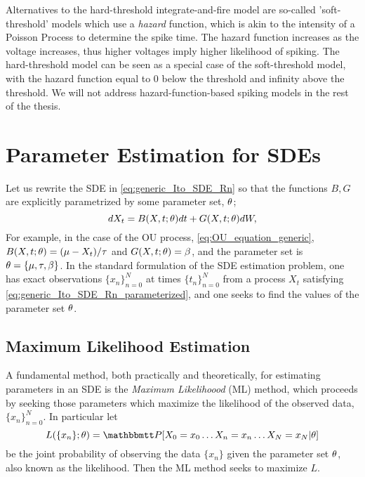 Alternatives to the hard-threshold integrate-and-fire model are so-called
'soft-threshold' models which use a {\sl hazard} function, which is akin to the
intensity of a Poisson Process to determine the spike time. The hazard function
increases as the voltage increases, thus higher voltages imply higher likelihood of
spiking. The hard-threshold model can be seen as a special case of the
soft-threshold model, with the hazard function equal to 0 below the threshold
and infinity above the threshold. We will not address hazard-function-based
spiking models in the rest of the thesis. 

\section{Parameter Estimation for SDEs}
\label{sec:estimation}
Let us rewrite the SDE in \cref{eq:generic_Ito_SDE_Rn} so that the 
functions $B, G$ are explicitly parametrized by some parameter set, ${ \theta}$;
\begin{equation}
dX_t = B(X,t;{ \theta}) dt + G(X,t;{ \theta}) dW,
\label{eq:generic_Ito_SDE_Rn_parameterized}
\end{equation}
For example, in the case of the OU process, \cref{eq:OU_equation_generic},
$B(X,t;{ \theta}) = ({\mu } - {X_t})/{{ \tau }}$ and $G(X,t;{ \theta}) = \beta$, and the
parameter set is ${ \theta} = \{{\mu }, { \tau }, \beta\}$. In the standard formulation of the SDE estimation problem,  
one has exact observations $\{x_n\}_{n=0}^N$ at times $\{t_n\}_{n=0}^N$ from a process $X_t$
satisfying \cref{eq:generic_Ito_SDE_Rn_parameterized}, and one seeks to find the
values of the parameter set ${ \theta}$.

\subsection{Maximum Likelihood Estimation}
A fundamental method, both
practically and theoretically, for estimating parameters in an SDE is the {\sl Maximum
Likelihoood} (ML) method, which proceeds by seeking those parameters which
maximize the likelihood of the observed data, $\{x_n\}_{n=0}^N$. In particular
let $$L(\{x_n\}; \th) = \Prob[ X_0 = x_0\ldots X_n = x_n\ldots X_N = x_N |
\th]$$ be the joint probability of observing the data $\{x_n\}$ given the
parameter set ${ \theta}$, also known as the likelihood. Then the ML method seeks to
maximize $L$.

